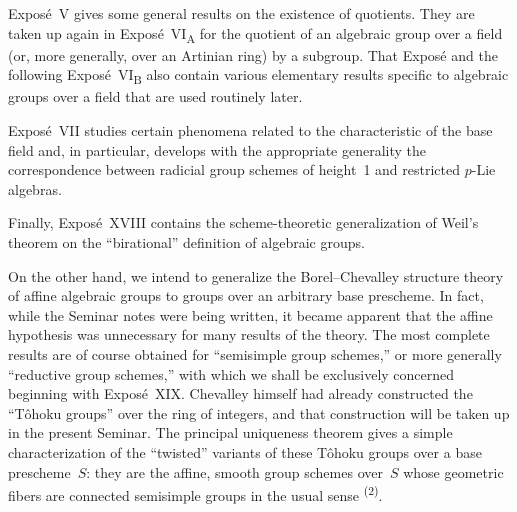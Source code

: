 Expos\'e~V gives some general results on the existence of quotients.  They are taken
up again in Expos\'e~VI\textsubscript{A} for the quotient of an algebraic group over
a field (or, more generally, over an Artinian ring) by a
subgroup.  That Expos\'e and the following
Expos\'e~VI\textsubscript{B} also contain various elementary results specific to
algebraic groups over a field that are used routinely later.

Expos\'e~VII studies certain phenomena related to the characteristic of the base
field and, in particular, develops with the appropriate generality the
correspondence between radicial group schemes of height~1 and restricted
$p$-Lie algebras.

Finally, Expos\'e~XVIII contains the scheme-theoretic generalization of Weil's
theorem on the ``birational'' definition of algebraic groups.

On the other hand, we intend to generalize the Borel--Chevalley structure theory of
affine algebraic groups to groups over an arbitrary base prescheme.  In fact, while
the Seminar notes were being written, it became apparent that the affine hypothesis
was unnecessary for many results of the theory.  The most complete results are of
course obtained for ``semisimple group schemes,'' or more generally ``reductive
group schemes,'' with which we shall be exclusively concerned beginning with
Expos\'e~XIX.  Chevalley himself had already constructed the ``T\^ohoku groups''
over the ring of integers, and that construction will be taken up in the present
Seminar.  The principal uniqueness
theorem gives a simple characterization of the ``twisted''
variants of these T\^ohoku groups over a base prescheme~$S$: they are the affine,
smooth group schemes over~$S$ whose geometric fibers are connected semisimple
groups in the usual sense%
\textsuperscript{(2)}.

